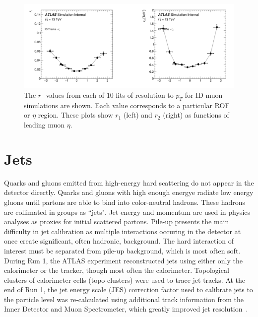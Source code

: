 \begin{figure}[!h]
	\centering 
    \includegraphics[width=.85\textwidth]{Pictures/parametrizationIDeta.PNG}
    \caption{ The $r$- values from each of $10$ fits of resolution to $p_T$ for ID muon simulations are shown. Each value corresponds to a particular ROF or $\eta$ region. These plots show $r_1$ (left) and $r_2$  (right) as functions of leading muon $\eta$.}
    \label{fig:parametrizationeta}
\end{figure}

\section{Jets}
Quarks and gluons emitted from high-energy hard scattering do not appear in the detector directly. Quarks and gluons with high enough energye radiate low energy gluons until partons are able to bind into color-neutral hadrons. These hadrons are collimated in groups as ``jets". Jet energy and momentum are used in physics analyses as proxies for initial scattered partons. Pile-up presents the main difficulty in jet calibration as multiple interactions occuring in the detector at once create significant, often hadronic, background. The hard interaction of interest must be separated from pile-up background, which is most often soft. During Run 1, the ATLAS experiment reconstructed jets using either only the calorimeter or the tracker, though most often the calorimeter. Topological clusters of calorimeter cells (topo-clusters) were used to trace jet tracks. At the end of Run 1, the jet energy scale (JES) correction factor used to calibrate jets to the particle level was re-calculated using additional track information from the Inner Detector and Muon Spectrometer, which greatly improved jet resolution~\cite{JetRun1}. 

